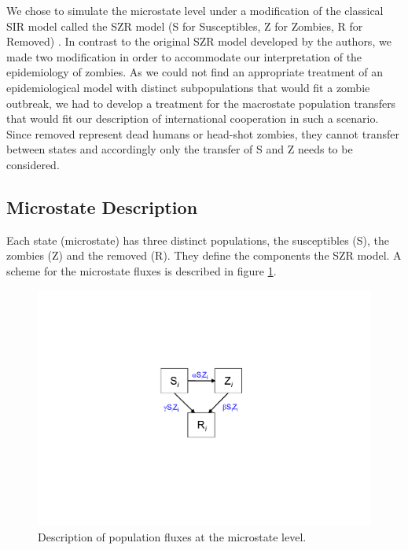 \documentclass[11pt]{article} %
\begin{document}
We chose to simulate the microstate level under a modification of the classical SIR model called the SZR model (S for Susceptibles, Z for Zombies, R for Removed) \cite{munz2009zombies}. In contrast to the original SZR model developed by the authors, we made two modification in order to accommodate our interpretation of the epidemiology of zombies. As we could not find an appropriate treatment of an epidemiological model with distinct subpopulations that would fit a zombie outbreak, we had to develop a treatment for the macrostate population transfers that would fit our description of international cooperation in such a scenario. Since removed represent dead humans or head-shot zombies, they cannot transfer between states and accordingly only the transfer of S and Z needs to be considered. 

\subsection{Microstate Description}\indent
\label{sec:microdescription}

Each state (microstate) has three distinct populations, the susceptibles (S), the zombies (Z) and the removed (R). They define the components the SZR model. A scheme for the microstate fluxes is described in figure \ref{microstate}.

\begin{figure}[h!]
\centerline{
\includegraphics[scale=0.55]{../images/Powerpoint_figures/microstate.pdf}}
\caption{Description of population fluxes at the microstate level. \label{microstate} }
\end{figure}
\end{document}
